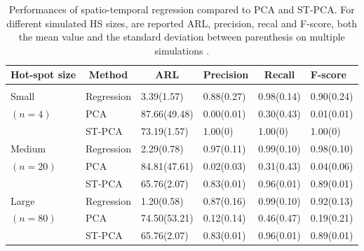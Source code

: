\begin{table}
\small
\centering
\begin{tabular}{llllll}
\hline
\rowcolor{bluepoli!40}
Hot-spot size & \multicolumn{1}{c}{Method} & \multicolumn{1}{c}{ARL} & \multicolumn{1}{c}{Precision} & \multicolumn{1}{c}{Recall} & F-score \\ 
\hline \hline 
\\
Small & Regression & 3.39(1.57) & 0.88(0.27) & 0.98(0.14) & 0.90(0.24)\\
$(n=4)$ & PCA & 87.66(49.48) & 0.00(0.01) & 0.30(0.43) & 0.01(0.01) \\
& ST-PCA & 73.19(1.57) & 1.00(0) & 1.00(0) & 1.00(0) \\[0.5 cm]
Medium & Regression & 2.29(0.78)& 0.97(0.11)& 0.99(0.10)& 0.98(0.10) \\
$(n=20)$& PCA& 84.81(47.61)& 0.02(0.03)& 0.31(0.43)& 0.04(0.06) \\
& ST-PCA& 65.76(2.07)& 0.83(0.01)& 0.96(0.01)& 0.89(0.01) \\[0.5 cm]
Large& Regression& 1.20(0.58)& 0.87(0.16)& 0.99(0.10)& 0.92(0.13) \\
$(n=80)$& PCA& 74.50(53.21)& 0.12(0.14)& 0.46(0.47)& 0.19(0.21) \\
& ST-PCA& 65.76(2.07)& 0.83(0.01)& 0.96(0.01)& 0.89(0.01) \\[0.5 cm]
\end{tabular}
\caption{Performances of spatio-temporal regression compared to PCA and ST-PCA. For different simulated HS sizes, are reported ARL, precision, recal and F-score, both the mean value and the standard deviation between parenthesis on multiple simulations \cite{yan_real-time_2021}.}
\label{tab:last}
\end{table}



